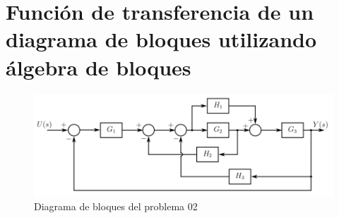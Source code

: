 \section{Función de transferencia de un diagrama de bloques
 utilizando álgebra de bloques }

 \begin{figure}[H]\label{fig:DB}
    \centering
    \includegraphics[width=\textwidth]{imagenes/bloques.png}
    \caption{Diagrama de bloques del problema 02}
 \end{figure}

